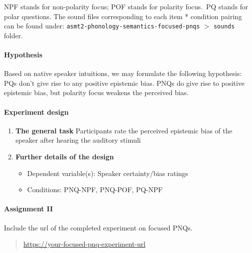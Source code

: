\documentclass{article}
\begin{document}
\noindent NPF stands for non-polarity focus; POF stands for polarity focus.\ PQ stands for polar questions. The sound files corresponding to each item * condition pairing can be found under: \texttt{asmt2-phonology-semantics-focused-pnqs} $>$ \texttt{sounds} folder.

\paragraph{Hypothesis}

Based on native speaker intuitions, we may formulate the following hypothesis: PQs don't give rise to any positive epistemic bias. PNQs do give rise to positive epistemic bias, but polarity focus weakens the perceived bias.

\paragraph{Experiment design}

\begin{enumerate}

    \item \textbf{The general task} Participants rate the perceived epistemic bias of the speaker after hearing the auditory stimuli

    \item \textbf{Further details of the design} 

    \begin{itemize}
        \item Dependent variable(s): Speaker certainty/bias ratings
        \item Conditions: PNQ-NPF, PNQ-POF, PQ-NPF
    \end{itemize}

\end{enumerate}

\paragraph{Assignment II}

Include the url of the completed experiment on focused PNQs.\ 

\begin{quotation}
\noindent
\url{https://your-focused-pnq-experiment-url}
\end{quotation}
\end{document}
